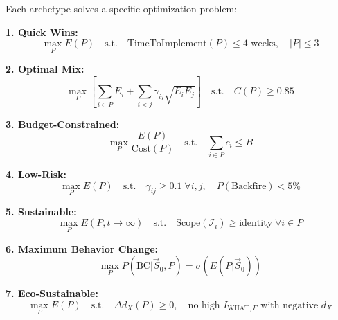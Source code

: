 \begin{tcolorbox}[colback=blue!5!white, colframe=blue!75!black,
    title=\textbf{Theorem HHH-T10: Archetype Optimization Problems}]

Each archetype solves a specific optimization problem:

\textbf{1. Quick Wins:}
\begin{equation}
\max_{P} E(P) \quad \text{s.t.} \quad \text{TimeToImplement}(P) \leq 4 \text{ weeks}, \quad |P| \leq 3
\end{equation}

\textbf{2. Optimal Mix:}
\begin{equation}
\max_{P} \left[ \sum_{i \in P} E_i + \sum_{i<j} \gamma_{ij} \sqrt{E_i E_j} \right] \quad \text{s.t.} \quad C(P) \geq 0.85
\end{equation}

\textbf{3. Budget-Constrained:}
\begin{equation}
\max_{P} \frac{E(P)}{\text{Cost}(P)} \quad \text{s.t.} \quad \sum_{i \in P} c_i \leq B
\end{equation}

\textbf{4. Low-Risk:}
\begin{equation}
\max_{P} E(P) \quad \text{s.t.} \quad \gamma_{ij} \geq 0.1 \; \forall i,j, \quad P(\text{Backfire}) < 5\%
\end{equation}

\textbf{5. Sustainable:}
\begin{equation}
\max_{P} E(P, t \to \infty) \quad \text{s.t.} \quad \text{Scope}(\mathcal{I}_i) \geq \text{identity} \; \forall i \in P
\end{equation}

\textbf{6. Maximum Behavior Change:}
\begin{equation}
\max_{P} P(\text{BC} | \vec{S}_0, P) = \sigma\left( E(P | \vec{S}_0) \right)
\end{equation}

\textbf{7. Eco-Sustainable:}
\begin{equation}
\max_{P} E(P) \quad \text{s.t.} \quad \Delta d_X(P) \geq 0, \quad \text{no high } I_{\text{WHAT},F} \text{ with negative } d_X
\end{equation}

\end{tcolorbox}


